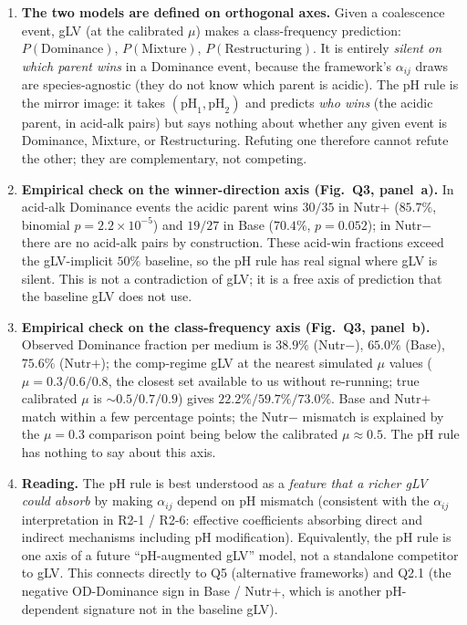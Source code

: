 \documentclass[11pt]{article}
\begin{document}
\begin{enumerate}[itemsep=2pt]
    \item \textbf{The two models are defined on orthogonal axes.} Given a coalescence event, gLV (at the calibrated $\mu$) makes a class-frequency prediction: $P(\text{Dominance})$, $P(\text{Mixture})$, $P(\text{Restructuring})$. It is entirely \emph{silent on which parent wins} in a Dominance event, because the framework's $\alpha_{ij}$ draws are species-agnostic (they do not know which parent is acidic). The pH rule is the mirror image: it takes $(\mathrm{pH}_1, \mathrm{pH}_2)$ and predicts \emph{who wins} (the acidic parent, in acid-alk pairs) but says nothing about whether any given event is Dominance, Mixture, or Restructuring. Refuting one therefore cannot refute the other; they are complementary, not competing.

    \item \textbf{Empirical check on the winner-direction axis (Fig.~Q3, panel~a).} In acid-alk Dominance events the acidic parent wins $30/35$ in Nutr$+$ ($85.7\%$, binomial $p = 2.2 \times 10^{-5}$) and $19/27$ in Base ($70.4\%$, $p = 0.052$); in Nutr$-$ there are no acid-alk pairs by construction. These acid-win fractions exceed the gLV-implicit $50\%$ baseline, so the pH rule has real signal where gLV is silent. This is not a contradiction of gLV; it is a free axis of prediction that the baseline gLV does not use.

    \item \textbf{Empirical check on the class-frequency axis (Fig.~Q3, panel~b).} Observed Dominance fraction per medium is $38.9\%$ (Nutr$-$), $65.0\%$ (Base), $75.6\%$ (Nutr$+$); the comp-regime gLV at the nearest simulated $\mu$ values ($\mu = 0.3 / 0.6 / 0.8$, the closest set available to us without re-running; true calibrated $\mu$ is $\sim 0.5/0.7/0.9$) gives $22.2\% / 59.7\% / 73.0\%$. Base and Nutr$+$ match within a few percentage points; the Nutr$-$ mismatch is explained by the $\mu = 0.3$ comparison point being below the calibrated $\mu \approx 0.5$. The pH rule has nothing to say about this axis.

    \item \textbf{Reading.} The pH rule is best understood as a \emph{feature that a richer gLV could absorb} by making $\alpha_{ij}$ depend on pH mismatch (consistent with the $\alpha_{ij}$ interpretation in R2-1 / R2-6: effective coefficients absorbing direct and indirect mechanisms including pH modification). Equivalently, the pH rule is one axis of a future ``pH-augmented gLV'' model, not a standalone competitor to gLV. This connects directly to Q5 (alternative frameworks) and Q2.1 (the negative OD-Dominance sign in Base / Nutr$+$, which is another pH-dependent signature not in the baseline gLV).


\end{enumerate}
\end{document}
